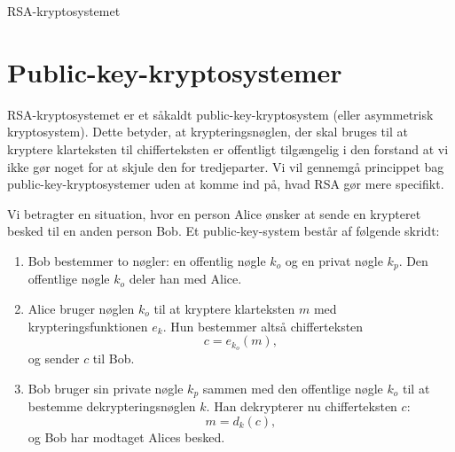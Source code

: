 \begin{center}
	\Huge
	RSA-kryptosystemet
\end{center}


\section*{Public-key-kryptosystemer}
RSA-kryptosystemet er et såkaldt public-key-kryptosystem (eller asymmetrisk kryptosystem). Dette betyder, at krypteringsnøglen, der skal bruges til at kryptere klarteksten til chifferteksten er offentligt tilgængelig i den forstand at vi ikke gør noget for at skjule den for tredjeparter. Vi vil gennemgå princippet bag public-key-kryptosystemer uden at komme ind på, hvad RSA gør mere specifikt.

Vi betragter en situation, hvor en person Alice ønsker at sende en krypteret besked til en anden person Bob. Et public-key-system består af følgende skridt:
\begin{enumerate}[label=\roman*)]
\item Bob bestemmer to nøgler: en offentlig nøgle $k_o$ og en privat nøgle $k_p$. Den offentlige nøgle $k_o$ deler han med Alice.
\item Alice bruger nøglen $k_o$ til at kryptere klarteksten $m$ med krypteringsfunktionen $e_k.$ Hun bestemmer altså chifferteksten
\[
c = e_{k_o}(m),
\]
og sender $c$ til Bob. 
\item Bob bruger sin private nøgle $k_p$ sammen med den offentlige nøgle $k_o$ til at bestemme dekrypteringsnøglen $k$. Han dekrypterer nu chifferteksten $c$:
\[
m = d_k(c),
\]
og Bob har modtaget Alices besked. 
\end{enumerate}

